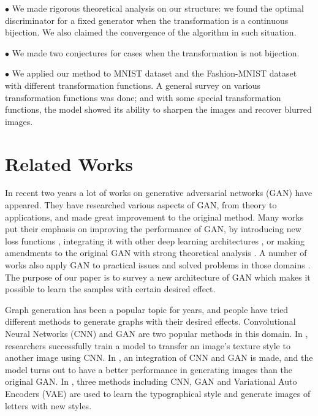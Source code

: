 \documentclass{article}
\begin{document}
$\bullet$
We made rigorous theoretical analysis on our structure: we found the optimal discriminator for a fixed generator when the transformation is a continuous bijection. We also claimed the convergence of the algorithm in such situation.

$\bullet$
We made two conjectures for cases when the transformation is not bijection.

$\bullet$
We applied our method to MNIST dataset \cite{MNIST} and the Fashion-MNIST dataset \cite{fashion_MNIST} with different transformation functions. A general survey on various transformation functions was done; and with some special transformation functions, the model showed its ability to sharpen the images and recover blurred images.


\section{Related Works}

In recent two years a lot of works on generative adversarial networks (GAN) have appeared. They have researched various aspects of GAN, from theory to applications, and made great improvement to the original method. Many works put their emphasis on improving the performance of GAN, by introducing new loss functions \cite{bGAN,fGAN,InfoGAN}, integrating it with other deep learning architectures \cite{DCGAN,GRAN,LAPGAN,seqGAN}, or making amendments to the original GAN with strong theoretical analysis \cite{EnergyGAN,WGAN,LSGAN}. A number of works also apply GAN to practical issues and solved problems in those domains \cite{seqGAN,cross-domain}. The purpose of our paper is to survey a new architecture of GAN which makes it possible to learn the samples with certain desired effect.


Graph generation has been a popular topic for years, and people have tried different methods to generate graphs with their desired effects. Convolutional Neural Networks (CNN) and GAN are two popular methods in this domain. In \cite{transfer_CNN}, researchers successfully train a model to transfer an image's texture style to another image using CNN. In \cite{DCGAN}, an integration of CNN and GAN is made, and the model turns out to have a better performance in generating images than the original GAN. In \cite{letter_CNN,letter_GAN,letter_VAE}, three methods including CNN, GAN and Variational Auto Encoders (VAE) are used to learn the typographical style and generate images of letters with new styles.
\end{document}
